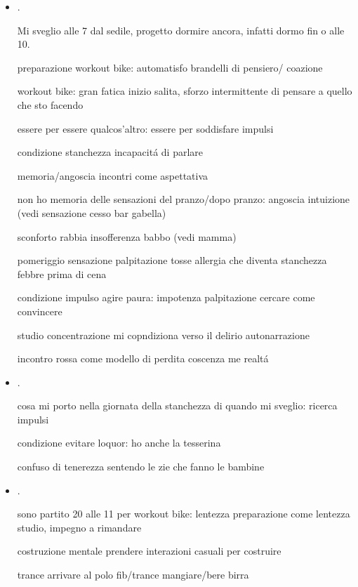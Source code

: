 \begin{itemize}
\item {}.

Mi sveglio alle 7 dal sedile, progetto dormire ancora, infatti dormo fin o alle 10.

preparazione workout bike: automatisfo brandelli di pensiero/ coazione

workout bike: gran fatica inizio salita, sforzo intermittente di pensare a quello che sto facendo

essere per essere qualcos'altro: essere per soddisfare impulsi

condizione stanchezza incapacit\'a di parlare


memoria/angoscia incontri come aspettativa

non ho memoria delle sensazioni del pranzo/dopo pranzo: angoscia intuizione (vedi sensazione cesso bar gabella)

sconforto rabbia insofferenza babbo (vedi mamma)

pomeriggio sensazione palpitazione tosse allergia che diventa stanchezza febbre prima di cena

condizione impulso agire paura: impotenza palpitazione cercare come convincere 

studio concentrazione mi copndiziona verso il delirio autonarrazione

incontro rossa come modello di perdita coscenza me realt\'a


\item {}.

cosa mi porto nella giornata della stanchezza di quando mi sveglio: ricerca impulsi

condizione evitare loquor: ho anche la tesserina

confuso di tenerezza sentendo le zie che fanno le bambine

\item {}.

sono partito 20 alle 11 per workout bike: lentezza preparazione come lentezza studio, impegno a rimandare

costruzione mentale prendere interazioni casuali per costruire 

trance arrivare al polo fib/trance mangiare/bere birra


\end{itemize}
